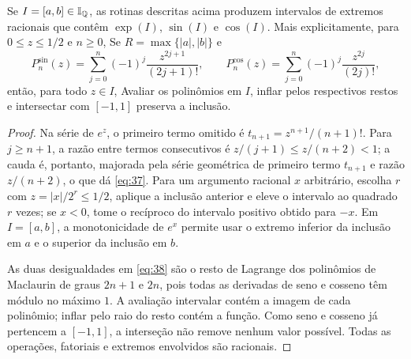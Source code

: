 \begin{lema}
Se $I=[a,b]\in\mathbb I_{\mathbb Q}$, as rotinas descritas acima produzem intervalos de extremos racionais que contêm $\exp(I)$, $\sin(I)$ e $\cos(I)$. Mais explicitamente, para $0\le z\le1/2$ e $n\ge0$,
Se $R=\max\{|a|,|b|\}$ e
\[
P_n^{\sin}(z)=\sum_{j=0}^n(-1)^j\frac{z^{2j+1}}{(2j+1)!},\qquad
P_n^{\cos}(z)=\sum_{j=0}^n(-1)^j\frac{z^{2j}}{(2j)!},
\]
então, para todo $z\in I$,
Avaliar os polinômios em $I$, inflar pelos respectivos restos e intersectar com $[-1,1]$ preserva a inclusão.
\end{lema}
\begin{proof}
Na série de $e^z$, o primeiro termo omitido é $t_{n+1}=z^{n+1}/(n+1)!$. Para $j\ge n+1$, a razão entre termos consecutivos é $z/(j+1)\le z/(n+2)<1$; a cauda é, portanto, majorada pela série geométrica de primeiro termo $t_{n+1}$ e razão $z/(n+2)$, o que dá \eqref{eq:37}. Para um argumento racional $x$ arbitrário, escolha $r$ com $z=|x|/2^r\le1/2$, aplique a inclusão anterior e eleve o intervalo ao quadrado $r$ vezes; se $x<0$, tome o recíproco do intervalo positivo obtido para $-x$. Em $I=[a,b]$, a monotonicidade de $e^x$ permite usar o extremo inferior da inclusão em $a$ e o superior da inclusão em $b$.

As duas desigualdades em \eqref{eq:38} são o resto de Lagrange dos polinômios de Maclaurin de graus $2n+1$ e $2n$, pois todas as derivadas de seno e cosseno têm módulo no máximo $1$. A avaliação intervalar contém a imagem de cada polinômio; inflar pelo raio do resto contém a função. Como seno e cosseno já pertencem a $[-1,1]$, a interseção não remove nenhum valor possível. Todas as operações, fatoriais e extremos envolvidos são racionais.
\end{proof}


